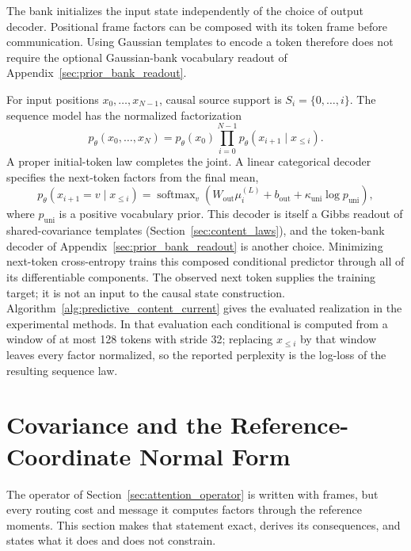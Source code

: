 \documentclass[twoside,11pt]{article}
\begin{document}
The bank initializes the input state independently of the choice of output decoder. Positional frame factors can be composed with its token frame before communication. Using Gaussian templates to encode a token therefore does not require the optional Gaussian-bank vocabulary readout of Appendix~\ref{sec:prior_bank_readout}.

\label{sec:autoregressive_prediction}

For input positions \(x_0,\ldots,x_{N-1}\), causal source support is \(S_i=\{0,\ldots,i\}\). The sequence model has the normalized factorization
\begin{equation}
p_\theta(x_0,\ldots,x_N)
=p_\theta(x_0)\prod_{i=0}^{N-1}p_\theta(x_{i+1}\mid x_{\le i}).
\label{eq:next_token_factorization_v2}
\end{equation}
A proper initial-token law completes the joint. A linear categorical decoder specifies the next-token factors from the final mean,
\begin{equation}
p_\theta(x_{i+1}=v\mid x_{\le i})
=\operatorname{softmax}_v\left(
W_{\mathrm{out}}\mu_i^{(L)}+b_{\mathrm{out}}
+\kappa_{\mathrm{uni}}\log p_{\mathrm{uni}}\right),
\label{eq:predictive_linear_decoder}
\end{equation}
where \(p_{\mathrm{uni}}\) is a positive vocabulary prior. This decoder is itself a Gibbs readout of shared-covariance templates (Section~\ref{sec:content_laws}), and the token-bank decoder of Appendix~\ref{sec:prior_bank_readout} is another choice. Minimizing next-token cross-entropy trains this composed conditional predictor through all of its differentiable components. The observed next token supplies the training target; it is not an input to the causal state construction. Algorithm~\ref{alg:predictive_content_current} gives the evaluated realization in the experimental methods. In that evaluation each conditional is computed from a window of at most 128 tokens with stride 32; replacing \(x_{\le i}\) by that window leaves every factor normalized, so the reported perplexity is the log-loss of the resulting sequence law.

\section{Covariance and the Reference-Coordinate Normal Form}
\label{sec:passive_covariance}

The operator of Section~\ref{sec:attention_operator} is written with frames, but every routing cost and message it computes factors through the reference moments. This section makes that statement exact, derives its consequences, and states what it does and does not constrain.
\end{document}
